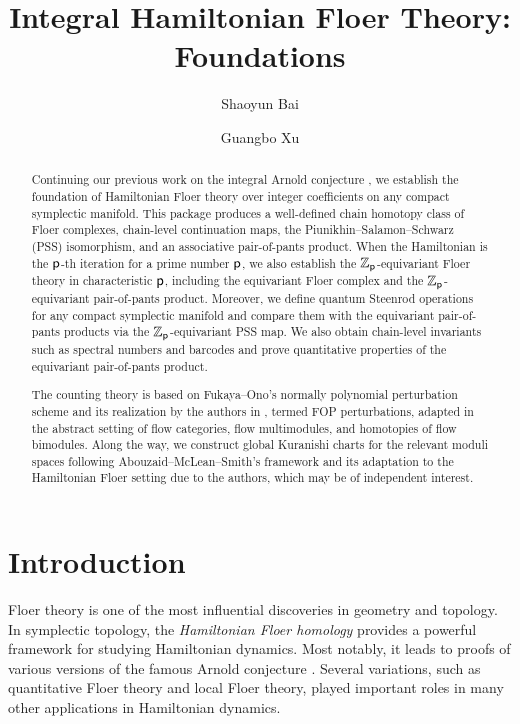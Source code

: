 \documentclass[reqno, 10pt]{amsart}
\title[Integral Hamiltonian Floer theory]{Integral Hamiltonian Floer Theory: Foundations}
\author{Shaoyun Bai}
\author{Guangbo Xu}
\numberwithin{equation}{section}
\numberwithin{equation}{section}
\theoremstyle{definition}
\theoremstyle{remark}
\newcommand{\mb}{\mathbb}
\newcommand{\p}{{\sf p}}
\newcommand{\zp}{{{\mb Z}_{\sf p}}}
\begin{document}
\begin{abstract}
Continuing our previous work on the integral Arnold conjecture \cite{Bai_Xu_Arnold}, we establish the foundation of Hamiltonian Floer theory over integer coefficients on any compact symplectic manifold. This package produces a well-defined chain homotopy class of Floer complexes, chain-level continuation maps, the Piunikhin--Salamon--Schwarz (PSS) isomorphism, and an associative pair-of-pants product. When the Hamiltonian is the $\p$-th iteration for a prime number $\p$, we also establish the $\zp$-equivariant Floer theory in characteristic $\p$, including the equivariant Floer complex and the $\zp$-equivariant pair-of-pants product. Moreover, we define quantum Steenrod operations for any compact symplectic manifold and compare them with the equivariant pair-of-pants products via the $\zp$-equivariant PSS map. We also obtain chain-level invariants such as spectral numbers and barcodes and prove quantitative properties of the equivariant pair-of-pants product.

The counting theory is based on Fukaya--Ono's normally polynomial perturbation scheme \cite{Fukaya_Ono_integer} and its realization by the authors in \cite{Bai_Xu_2022}, termed FOP perturbations, adapted in the abstract setting of flow categories, flow multimodules, and homotopies of flow bimodules. Along the way, we construct global Kuranishi charts for the relevant moduli spaces following Abouzaid--McLean--Smith's framework and its adaptation to the Hamiltonian Floer setting due to the authors, which may be of independent interest.

\end{abstract}

\maketitle


\setcounter{tocdepth}{1}
\tableofcontents

\section{Introduction}



Floer theory is one of the most influential discoveries in geometry and topology. In symplectic topology, the {\it Hamiltonian Floer homology} \cite{Floer_CMP} provides a powerful framework for studying Hamiltonian dynamics. Most notably, it leads to proofs of various versions of the famous Arnold conjecture \cite{Arnold_conjecture}. Several variations, such as quantitative Floer theory and local Floer theory, played important roles in many other applications in Hamiltonian dynamics. 
\end{document}

